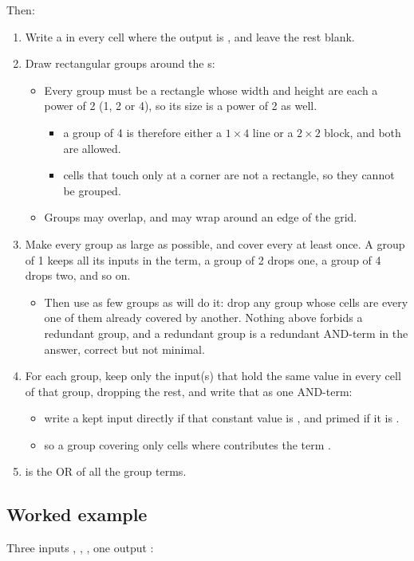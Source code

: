 Then:
\begin{enumerate}
  \item Write a  in every cell where the output is , and leave the rest blank.
  \item Draw rectangular groups around the s:
    \begin{itemize}
      \item Every group must be a rectangle whose width and height are each a power of 2 (1, 2 or
        4), so its size is a power of 2 as well.
        \begin{itemize}
          \item a group of 4 is therefore either a $1\times4$ line or a $2\times2$ block, and both
            are allowed.
          \item cells that touch only at a corner are not a rectangle, so they cannot be grouped.
        \end{itemize}
      \item Groups may overlap, and may wrap around an edge of the grid.
    \end{itemize}
  \item Make every group as large as possible, and cover every  at least once. A group of 1
    keeps all its inputs in the term, a group of 2 drops one, a group of 4 drops two, and so on.
    \begin{itemize}
      \item Then use as few groups as will do it: drop any group whose cells are every one of them
        already covered by another. Nothing above forbids a redundant group, and a redundant group
        is a redundant AND-term in the answer, correct but not minimal.
    \end{itemize}
  \item For each group, keep only the input(s) that hold the same value in every cell of that
    group, dropping the rest, and write that as one AND-term:
    \begin{itemize}
      \item write a kept input directly if that constant value is , and primed if it is
        .
      \item so a group covering only cells where  contributes the term .
    \end{itemize}
  \item {} is the OR of all the group terms.
\end{enumerate}

\subsection{Worked example}
\label{c2:kmapexample}
Three inputs , , , one output :

